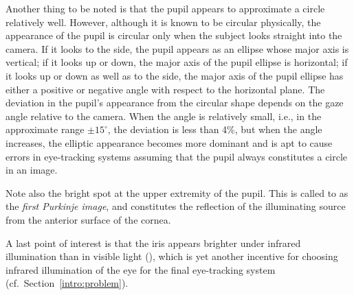 Another thing to be noted is that the pupil appears to approximate a
circle relatively well.  However, although it is known to be circular
physically, the appearance of the pupil is circular only when the
subject looks straight into the camera.  If it looks to the side, the
pupil appears as an ellipse whose major axis is vertical; if it looks
up or down, the major axis of the pupil ellipse is horizontal; if it
looks up or down as well as to the side, the major axis of the pupil
ellipse has either a positive or negative angle with respect to the
horizontal plane.  The deviation in the pupil's appearance from the
circular shape depends on the gaze angle relative to the camera.  When
the angle is relatively small, i.e., in the approximate range $\pm
15^{\circ}$, the deviation is less than 4\%, but when the angle
increases, the elliptic appearance becomes more dominant and is apt to
cause errors in eye-tracking systems assuming that the pupil always
constitutes a circle in an image.

Note also the bright spot at the upper extremity of the pupil.  This
is called to as the {\em first Purkinje image\/}, and constitutes the
reflection of the illuminating source from the anterior surface of the
cornea.  

A last point of interest is that the iris appears brighter under
infrared illumination than in visible light (\cite{template}), which
is yet another incentive for choosing infrared illumination of the eye
for the final eye-tracking system (cf.\ Section~\ref{intro:problem}).


